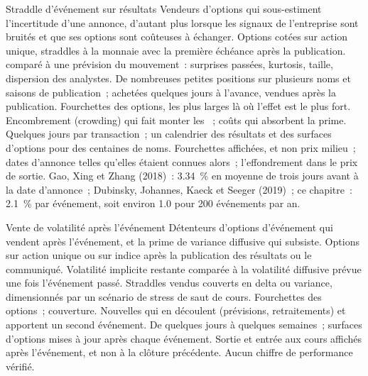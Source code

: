 \begin{strategyfile}{Straddle d'événement sur résultats}\label{strat:s2:gamma-scalping-and-event-volatility:earnings}
 Vendeurs d'options qui sous-estiment l'incertitude d'une annonce, d'autant plus lorsque les signaux de l'entreprise sont bruités et que ses
options sont coûteuses à échanger.
 Options cotées sur action unique, straddles à la monnaie avec la première échéance après la publication.
  comparé à une prévision du mouvement~: surprises passées, kurtosis, taille, dispersion des analystes.
 De nombreuses petites positions sur plusieurs noms et saisons de publication~; achetées quelques jours à l'avance, vendues après la publication.
 Fourchettes des options, les plus larges là où l'effet est le plus fort.
 Encombrement (crowding) qui fait monter les ~; coûts qui absorbent la prime.
 Quelques jours par transaction~; un calendrier des résultats et des surfaces d'options pour des centaines de noms.
 Fourchettes affichées, et non prix milieu~; dates d'annonce telles qu'elles étaient connues alors~; l'effondrement dans le prix de sortie.
 Gao, Xing et Zhang (2018)~: 3.34~\% en moyenne de trois jours avant à la date d'annonce~; Dubinsky, Johannes, Kaeck et Seeger
(2019)~; ce chapitre~: 2.1~\% par événement, soit environ 1.0 pour 200 événements par an.
\end{strategyfile}

\begin{strategyfile}{Vente de volatilité après l'événement}\label{strat:s2:gamma-scalping-and-event-volatility:postevent}
 Détenteurs d'options d'événement qui vendent après l'événement, et la prime de variance diffusive qui subsiste.
 Options sur action unique ou sur indice après la publication des résultats ou le communiqué.
 Volatilité implicite restante comparée à la volatilité diffusive prévue une fois l'événement passé.
 Straddles vendus couverts en delta ou variance, dimensionnés par un scénario de stress de saut de cours.
 Fourchettes des options~; couverture.
 Nouvelles qui en découlent (prévisions, retraitements) et apportent un second événement.
 De quelques jours à quelques semaines~; surfaces d'options mises à jour après chaque événement.
 Sortie et entrée aux cours affichés après l'événement, et non à la clôture précédente.
 Aucun chiffre de performance vérifié.
\end{strategyfile}

